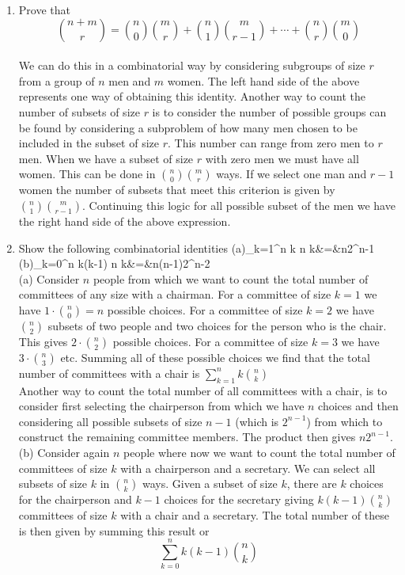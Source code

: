 \documentclass[12pt]{article}%
\newcommand{\0}{{\bf 0}}
\begin{document}
\begin{enumerate}
\item  
Prove that
$$
{n+m\choose r}={n\choose 0}{m\choose r}+{n\choose 1}{m\choose r-1}+\cdots+{n\choose r}{m\choose 0}$$
\\
{\color{blue}{\bf Sol.}}
We can do this in a combinatorial way by considering subgroups of size $r$ from a group of $n$ men and $m$ women. The left hand side of the above represents one way of obtaining this identity. Another way to count the number of subsets of size $r$ is to consider the number of possible groups can be found by considering a subproblem of how many men chosen to be included in the subset of size $r$. This number can range from zero men to $r$ men. When
we have a subset of size $r$ with zero men we must have all women. This can be done in
${n\choose 0}{m\choose r}$ ways. If we select one man and $r-1$ women the number of subsets that meet this criterion is given by ${n\choose 1}{m\choose r-1}$. Continuing this logic for all possible subset of
the men we have the right hand side of the above expression.


\item 
Show the following combinatorial identities
\bea
(a)\sum_{k=1}^n k  {n \choose k}&=&n2^{n-1}\nn\\
(b)\sum_{k=0}^n k(k-1)  {n \choose k}&=&n(n-1)2^{n-2}\nn
\eea
\\
{\color{blue}{\bf Sol.}}
(a) Consider $n$ people from which we want to count the total number of committees
of any size with a chairman. For a committee of size $k = 1$ we have $1\cdot{n\choose 0}=n$ possible choices. For a committee of size $k = 2$ we have ${n\choose 2}$ subsets of two people and two choices
for the person who is the chair. This gives $2\cdot {n\choose 2}$ possible choices. For a committee of size
$k = 3$ we have $3\cdot {n\choose 3}$ etc. Summing all of these possible choices we find that the total
number of committees with a chair is $\sum_{k=1}^n k  {n \choose k}$
\\
Another way to count the total number of all committees with a chair, is to consider first
selecting the chairperson from which we have $n$ choices and then considering all possible
subsets of size $n - 1$ (which is $2^{n-1}$) from which to construct the remaining committee
members. The product then gives $n2^{n-1}$.
\\

(b) Consider again $n$ people where now we want to count the total number of committees of size $k$ with a chairperson and a secretary. We can select all subsets of size $k$ in ${n\choose k}$ ways. Given a subset of size $k$, there are $k$ choices for the chairperson and $k-1$ choices for the secretary giving $k(k-1){n\choose k}$
committees of size $k$ with a chair and a secretary. The
total number of these is then given by summing this result or 
$$\sum_{k=0}^n k(k-1){n \choose k}$$


\end{enumerate}
\end{document}
